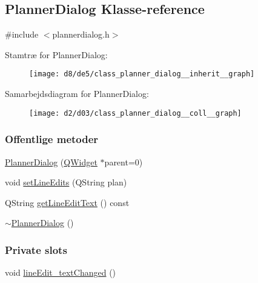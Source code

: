 \hypertarget{class_planner_dialog}{}\subsection{Planner\+Dialog Klasse-\/reference}
\label{class_planner_dialog}


{\ttfamily \#include $<$plannerdialog.\+h$>$}



Stamtræ for Planner\+Dialog\+:\nopagebreak
\begin{figure}[H]
\begin{center}
\leavevmode
\texttt{[image: d8/de5/class\_planner\_dialog\_\_inherit\_\_graph]}
\end{center}
\end{figure}


Samarbejdsdiagram for Planner\+Dialog\+:\nopagebreak
\begin{figure}[H]
\begin{center}
\leavevmode
\texttt{[image: d2/d03/class\_planner\_dialog\_\_coll\_\_graph]}
\end{center}
\end{figure}
\subsubsection*{Offentlige metoder}
\begin{DoxyCompactItemize}
\item 
\hyperlink{class_planner_dialog_a2f5d2ba887c4b70a3f28d78955aa1536}{Planner\+Dialog} (\hyperlink{class_q_widget}{Q\+Widget} $\ast$parent=0)
\item 
void \hyperlink{class_planner_dialog_a83441caf32a5806cfbb5f0796065d352}{set\+Line\+Edits} (Q\+String plan)
\item 
Q\+String \hyperlink{class_planner_dialog_a7c9482ec9a38bf3d4a90dadf6dc3f572}{get\+Line\+Edit\+Text} () const 
\item 
\hyperlink{class_planner_dialog_a24842220c2a6f2dde621b5ef0bde0217}{$\sim$\+Planner\+Dialog} ()
\end{DoxyCompactItemize}
\subsubsection*{Private slots}
\begin{DoxyCompactItemize}
\item 
void \hyperlink{class_planner_dialog_ad59b9da096cc8570abaf6156512b10a8}{line\+Edit\+\_\+text\+Changed} ()
\end{DoxyCompactItemize}
